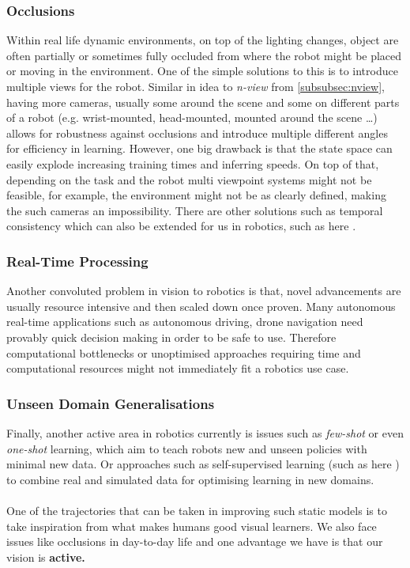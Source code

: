     \subsubsection{Occlusions}
      Within real life dynamic environments, on top of the lighting changes, object are often partially or sometimes fully occluded from where the robot might be placed or moving in the environment. 
      One of the simple solutions to this is to introduce multiple views for the robot. Similar in idea to \emph{n-view} from \ref{subsubsec:nview}, having more cameras, usually some around the scene and some on different parts of a robot (e.g. wrist-mounted, head-mounted, mounted around the scene \ldots) allows for robustness against occlusions and introduce multiple different angles for efficiency in learning. 
      However, one big drawback is that the state space can easily explode increasing training times and inferring speeds. On top of that, depending on the task and the robot multi viewpoint systems might not be feasible, for example, the environment might not be as clearly defined, making the such cameras an impossibility. There are other solutions such as temporal consistency \cite{lai2018learningblindvideotemporal} which can also be extended for us in robotics, such as here \cite{billington2007using, yang2021reactive}.

    \subsubsection{Real-Time Processing}
    Another convoluted problem in vision to robotics is that, novel advancements are usually resource intensive and then scaled down once proven. Many autonomous real-time  applications such as autonomous driving, drone navigation need provably quick decision making in order to be safe to use. Therefore computational bottlenecks or unoptimised approaches requiring time and computational resources might not immediately fit a robotics use case.

    \subsubsection{Unseen Domain Generalisations}
    Finally, another active area in robotics currently is issues such as \emph{few-shot} or even \emph{one-shot} learning, which aim to teach robots new and unseen policies with minimal new data. Or approaches such as self-supervised learning (such as here \cite{lim2022real2sim2real, huang2021robot}) to combine real and simulated data for optimising learning in new domains.
    \\\\
    One of the trajectories that can be taken in improving such static models is to take inspiration from what makes humans good visual learners. We also face issues like occlusions in day-to-day life and one advantage we have is that our vision is \textbf{active.}
    
  

    